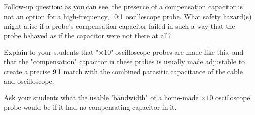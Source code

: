 Follow-up question: as you can see, the presence of a compensation capacitor is not an option for a high-frequency, 10:1 oscilloscope probe.  What safety hazard(s) might arise if a probe's compensation capacitor failed in such a way that the probe behaved as if the capacitor were not there at all?







Explain to your students that "$\times 10$" oscilloscope probes are made like this, and that the "compensation" capacitor in these probes is usually made adjustable to create a precise 9:1 match with the combined parasitic capacitance of the cable and oscilloscope.

Ask your students what the usable "bandwidth" of a home-made $\times 10$ oscilloscope probe would be if it had no compensating capacitor in it.




